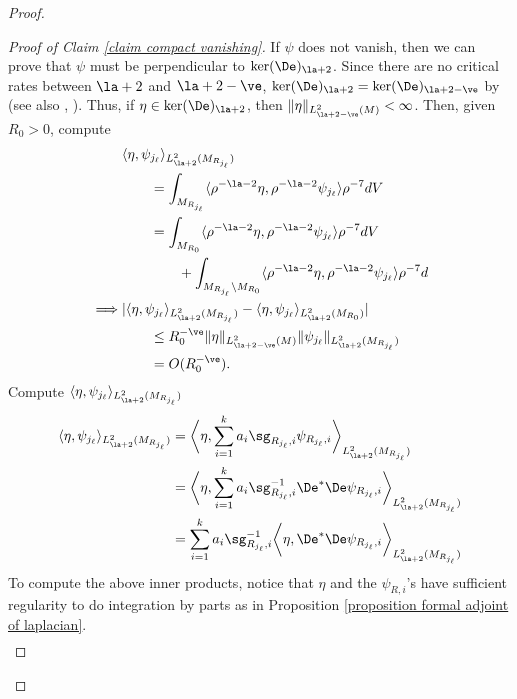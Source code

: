 \documentclass[hidelinks, 12pt, oneside, reqno]{amsart}
\begin{document}
\begin{proof}
\begin{proof}[Proof of Claim \ref{claim compact vanishing}]
    If $\psi$ does not vanish, then we can prove that $\psi$ must be perpendicular to $\ker(\De)_{\la+2}$.  Since there are no critical rates between $\la + 2$ and $\la + 2 - \ve$, $\ker(\De)_{\la+2} = \ker(\De)_{\la+2 - \ve}$ by \cite[Theorem 4.10]{KarigiannisLotay} (see also \cite{Lockhart1987}, \cite{LockhartMcOwen1985}). Thus, if $\eta \in \ker (\De)_{\la + 2}$, then $\|\eta\|_{L^2_{\la + 2 -\ve}(M)} < \infty$. Then, given $R_0 > 0$, compute
    \begin{align*}
        &\langle \eta, \psi_{j_\ell} \rangle_{L^2_{\la + 2}(M_{R_{j_\ell}})}\\
        &\qquad = \int_{M_{R_{j_\ell}}} \langle \rho^{-\la - 2} \eta, \rho^{-\la - 2} \psi_{j_\ell} \rangle \rho^{-7} dV \\
        &\qquad = \int_{M_{R_0}}\langle \rho^{-\la - 2} \eta, \rho^{-\la - 2} \psi_{j_\ell} \rangle \rho^{-7} dV \\
        &\qquad \qquad+ \int_{M_{R_{j_\ell}} \setminus M_{R_0}}\langle \rho^{-\la - 2} \eta, \rho^{-\la - 2} \psi_{j_\ell} \rangle \rho^{-7} d \\
        \implies  & | \langle \eta, \psi_{j_\ell} \rangle_{L^2_{\la + 2}(M_{R_{j_\ell}})} - \langle \eta, \psi_{j_\ell} \rangle_{L^2_{\la + 2}(M_{R_0})}| \\
        &\qquad \le R_0^{-\ve}\|\eta\|_{L^2_{\la + 2 -\ve}(M)}\|\psi_{j_\ell}\|_{L^2_{\la + 2}(M_{R_{j_\ell}})}\\ 
        &\qquad = O(R_0^{-\ve}). 
    \end{align*}
    Compute $\langle \eta, \psi_{j_\ell} \rangle_{L^2_{\la + 2}(M_{R_{j_\ell}})}$
    \begin{align*}
        \langle \eta, \psi_{j_\ell} \rangle_{L^2_{\la + 2}(M_{R_{j_\ell}})} &= \bigg\langle \eta, \sum_{i=1}^k a_i \sg_{R_{j_\ell},i}\psi_{R_{j_\ell}, i} \bigg\rangle_{L^2_{\la + 2}(M_{R_{j_\ell}})}  \\
        &=  \bigg\langle \eta, \sum_{i=1}^k a_i \sg_{R_{j_\ell},i}^{-1} \De^*\De \psi_{R_{j_\ell}, i} \bigg\rangle_{L^2_{\la + 2}(M_{R_{j_\ell}})}  \\
         &=  \sum_{i=1}^k a_i \sg_{R_{j_\ell}, i}^{-1} \bigg\langle \eta, \De^*\De \psi_{R_{j_\ell}, i} \bigg\rangle_{L^2_{\la + 2}(M_{R_{j_\ell}})} 
    \end{align*}
    To compute the above inner products, notice that $\eta$ and the $\psi_{R,i}$'s have sufficient regularity to do integration by parts as in Proposition \ref{proposition formal adjoint of laplacian}.
    \begin{align*}

\end{align*}
\end{proof}
\end{proof}
\end{document}
